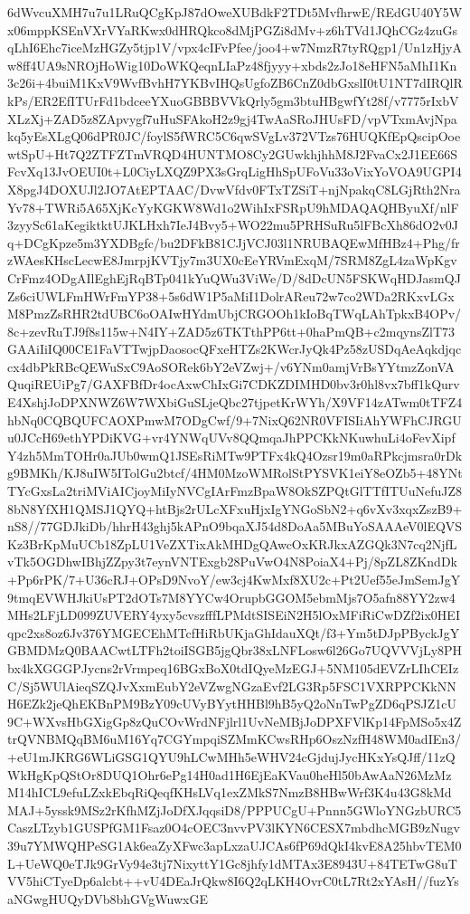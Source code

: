 {{{{6dWvcuXMH7u7u\ncHV1LRuQCgKpJ87dOweXUBdkF2TDt5MvfhrwE/REdGU40Y5Wx06mppKSEnVXrVYaRKwx0dHRQkco\ng8dMjPGZi8dMv+z6hTVd1JQhCGz4zuGsqLhI6Ehc7iceMzHGZy5tjp1V/vpx4cIFvPfee/joo4+w\nefNm7NmzR7tyRQgp1/Un1zHjyAw8ff4UA9sNROjHoWig10DoWKQeqnLIaPz48fjyyy+xbds2zJo1\nCwEBAVi8eHFN5aMhI1Kn3c26i+4buiM1KxV9WvfBvhH7YKBvIHQsUgfoZB6CnZ0dbGxslI0tU1NT\n7dIRQlRkPs/ER2EfITUrFd1bdceeYXuoGBBBVVkQrly5gm3btuHBgwfYt28f/v7775rIxbVXLzXj\nAY+ZAD5z8ZApvygf7uHuSFAkoH2z9gj4TwAaSRoJHUsFD/vpVTxmAvjNpakq5yEsXLgQ06dPR0JC/foylS5fWRC5C6qwSVgLv372VTzs76HUQKfEpQscipOoewtSpU+Ht7Q2ZTFZTmVRQD4HUNTMO\nz8Cy2GUwkhjhhM8J2FvaCx2J1EE66SFcvXq13JvOEUI0t+L0CiyLXQZ9PX3sGrqLigHhSpUFoVu3\nbiq3oVixYoVOA9UGPI4X8pgJ4DOXUJl2JO7AtEPTAAC/DvwVfdv0FTxTZSiT+njNpakqC8LGjRth\naWkJGxsb2NraYv78+TWRi5A65XjKcYyKGKW8Wd1o2WihIxFSRpU9hMDAQAQHByuXf/nlF3zyySc6\nD1aKegiktktUJKLHxh7IeJ4Bvy5+WO22mu5PRHSuRu5lFBcXh86dO2v0Jq+DCgKpze5m3YXDBgfc/bu2DFkB81CJjVCJ03l1NRUBAQEwMfHBz4+Phg/frzWAesKHscLecwE8JmrpjKVTjy7m3UX\njq0cEeYRVmExqM/7SRM8ZgL4zaWpKgvCrFmz4ODgAIlEghEjRqBTp041kYuQWu3ViWe/D/8dDcUN\nhY5FSKWqHDJasmQJZs6ciUWLFmHWrFmYP38+5s6dW1P5aMiI1DolrAReu72w7co2WDa2RKxvLGxM\nbISOReoZnQwZXbhwASkpKUhLS8PmzZsRHR2tdUBC6oOAIwHYdmUbjCRGOOh1kIoBqTWqLAhTpkxB\nTk4OPv/8c+zevRuTJ9f8s115w+N4IY+ZAD5z6TKTthPP6tt+0haPmQB+c2mqynsZlT73GAAiIiIQ\nFxen00CE1FaVTTwjpDaosocQFxeHTZs2KWcrJyQk4Pz58zUSDqAeAqkdjqccx4dbPkRBcQEWuSxC\nYI9AoSORek6bY2eVZwj+/v6YNm0amjVrBsYYtmzZonVAQuqiREUiPg7/GAXFBfDr4ocAxwChIxGi\nlSp7CDKZDIMHD0bv3r0hl8vx7bff1kQurvE4XshjJoDPXNWZ6W7WXbiGuSLjeQbc27tjpetKrWYh/X9VF14zATwm0tTFZ4hbNq0CQBQUFCAOXPmwM7ODgCwf/9+7NixQ62NR0VFISIiAhYWFhCJRGUu\nVw0JCcH69ethYPDiKVG+vr4YNWqUVv8QQmqaJhPPCKkNKuwhuLi4oFevXipfY4zh5MmTOHr0aJUb\nzsvLg0wmQ1JSEsRiMTw9PTFx4kQ4Ozsr19m0aRPkcjmsra0rDkg9BMKh/KJ8uIW5ITolGu2btcf/\nfP4HM0MzoWMRolStPYSVK1eiY8eOZb5+48YNtTYcGxsLa2triMViAICjoyMiIyNVCgIArFmzBpaW\nlsjLy8OkSZPQtGlTTfITUuNefuJZ88bN8YfXH1QMSJ1QYQ+htBjs2rULcXFxuHjxIgYNGoSbN2+q\ntWGFQgEjIyPlsrGxMRQKhco6vXv3xqxZszB9+nS8//77GDJkiDb/hhrH43ghj5kAPnO9bqaXJ54d\n8DoAa5MBuYoSAAAeV0lEQVSKz3BrKpMuUCb18ZpLU1VeZXTixAkMHDgQAwcOxKRJkxAZGQk3N7cq\nNyyVSlUerJOZmQmpVKqyjo2NjfLvTk5OGDhwIBhjZZpy3t7eynVNTExgb28PuVwO4N8PoiaX4+Pj/8pZL8ZKndDk+Pp6rPK/7+U36cRJ+OPsD9NvoY/ew3cj4KwMxf8XU2c+Pt2Uef55eJmSemJgY\nhISEAFA9tmqEVWHJkiUsPT2dOTs7M8YYCw4OrupbGGOM5ebmMjs7O5afn88YY2zw4MHs2LFjLD09\nnWVlZTHGGPvyyy9ZUVERY4yxy5cvszfffLPMdtSISEiN2H5lOxMFiRiCwDZf2ix0HEIqpc2xs8oz\nhKtXr6Jv376YMGECEhMTcfHiRbUKjaGhIdauXQt/f3+Ym5tDJpPByckJgYGBMDMzQ0BAACwtLTFh\nwgTY2toiISGB5jgQbr38xLNFLosw6l26Go7UQVVVjLy8PHbx4kXGGGPJycns2rVrmpeq16BGxBoX\nHR0tdIQyeMzEGJ+5NM105dEVZrLIhCEIzC/Sj5WUlAieqSZQJvXxmEubY2eVZwgNGzaEvf2LG3Rp\nPS5FSC1VXRPPCKkNNH6EZk2jeQhEKBnPM9BzY09cUVyBYytHHBl9hB5yQ2oNnTwPgZD6qPSJZ1cU\nV9C+WXvsHbGXigGp8zQuCOvWrdNFjlrl1UvNeMBjJoDPXFVlKp14FpMSo5x4ZtrQVNBMQqBM6uM1\nl6Yq7CGYmpqiSZMmKCwsRHp6OszNzfH48WM0adIEn3/+eU1mJKRG6WLiGSG1QYU9hLCwMHh5eWHV\nqlUYN24cGjdujJycHKxYsQJff/11zQWkHgKpQStOr8DUQ1Ohr6ePg14H0ad1H6EjEaKVau0heHl5\nAQAePXqExo0bAwAaN26MzMzM14hICL9efuLZxkEbqRiQeqfKHsLVq1exZMkS7NmzB8HBwWrf3K4u\n43G8kMdMAJ+5yssk9MSz2rKfhMZjJoDfXJqqsiD8/PPPUCgU+Pnnn5GWloYNGzbURC5CaszLTzyb\n1GUSPfGM1Fsaz0O4cOEC3nvvPV3lKYN6CESX7mbdhcMGB9zNugv39u7YMWQHPeSG1Ak6eaZyXFwc\nNm3apLxzaUJCAs6fP69dQkI4kvE8A25hbvTEM0L+UeWQ0eTJk9GrVy94e3tj7NixyttY1Gc8jhfy\nmAngM1dMTAx3E8943U+84TETwG8uTVV5hiCTyeDp6alcbt++vU4DEaJrQkw8I6Q2qLKH4OvrC0tL\nS7Rt2xYAsH//fuzYsaNGwgHUQyDVb8bhGVgWuwxGE}}}}
